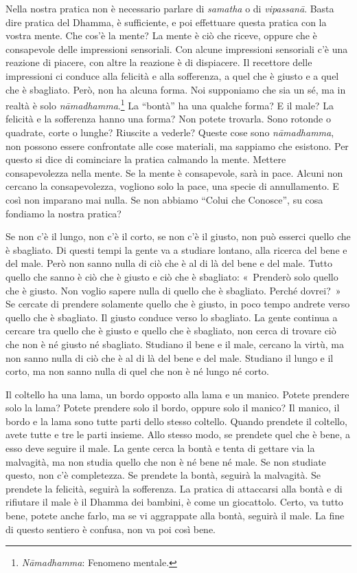 Nella nostra pratica non è necessario parlare di
\emph{samatha} o di \emph{vipassanā}. Basta dire
pratica del Dhamma, è sufficiente, e poi effettuare questa pratica con
la vostra mente. Che cos'è la mente? La mente è ciò che riceve, oppure
che è consapevole delle impressioni sensoriali. Con alcune impressioni
sensoriali c'è una reazione di piacere, con altre la reazione è di
dispiacere. Il recettore delle impressioni ci conduce alla felicità e
alla sofferenza, a quel che è giusto e a quel che è sbagliato. Però, non
ha alcuna forma. Noi supponiamo che sia un sé, ma in realtà è solo
\emph{nāmadhamma}.\footnote{\emph{Nāmadhamma}: Fenomeno mentale.} La
``bontà'' ha una qualche forma? E il male? La felicità e la sofferenza
hanno una forma? Non potete trovarla. Sono rotonde o quadrate, corte o
lunghe? Riuscite a vederle? Queste cose sono \emph{nāmadhamma}, non
possono essere confrontate alle cose materiali, ma sappiamo che
esistono. Per questo si dice di cominciare la pratica calmando la mente.
Mettere consapevolezza nella mente. Se la mente è consapevole, sarà in
pace. Alcuni non cercano la consapevolezza, vogliono solo la pace, una
specie di annullamento. E così non imparano mai nulla. Se non abbiamo
``Colui che Conosce'', su cosa fondiamo la nostra pratica?

Se non c'è il lungo, non c'è il corto, se non c'è il giusto, non può
esserci quello che è sbagliato. Di questi tempi la gente va a studiare
lontano, alla ricerca del bene e del male. Però non sanno nulla di ciò
che è al di là del bene e del male. Tutto quello che sanno è ciò che è
giusto e ciò che è sbagliato: «~Prenderò solo quello che è giusto. Non
voglio sapere nulla di quello che è sbagliato. Perché dovrei?~» Se
cercate di prendere solamente quello che è giusto, in poco tempo andrete
verso quello che è sbagliato. Il giusto conduce verso lo sbagliato. La
gente continua a cercare tra quello che è giusto e quello che è
sbagliato, non cerca di trovare ciò che non è né giusto né sbagliato.
Studiano il bene e il male, cercano la virtù, ma non sanno nulla di ciò
che è al di là del bene e del male. Studiano il lungo e il corto, ma non
sanno nulla di quel che non è né lungo né corto.

Il coltello ha una lama, un bordo opposto alla lama e un manico. Potete
prendere solo la lama? Potete prendere solo il bordo, oppure solo il
manico? Il manico, il bordo e la lama sono tutte parti dello stesso
coltello. Quando prendete il coltello, avete tutte e tre le parti
insieme. Allo stesso modo, se prendete quel che è bene, a esso deve
seguire il male. La gente cerca la bontà e tenta di gettare via la
malvagità, ma non studia quello che non è né bene né male. Se non
studiate questo, non c'è completezza. Se prendete la bontà, seguirà la
malvagità. Se prendete la felicità, seguirà la sofferenza. La pratica di
attaccarsi alla bontà e di rifiutare il male è il Dhamma dei bambini, è
come un giocattolo. Certo, va tutto bene, potete anche farlo, ma se vi
aggrappate alla bontà, seguirà il male. La fine di questo sentiero è
confusa, non va poi così bene.

